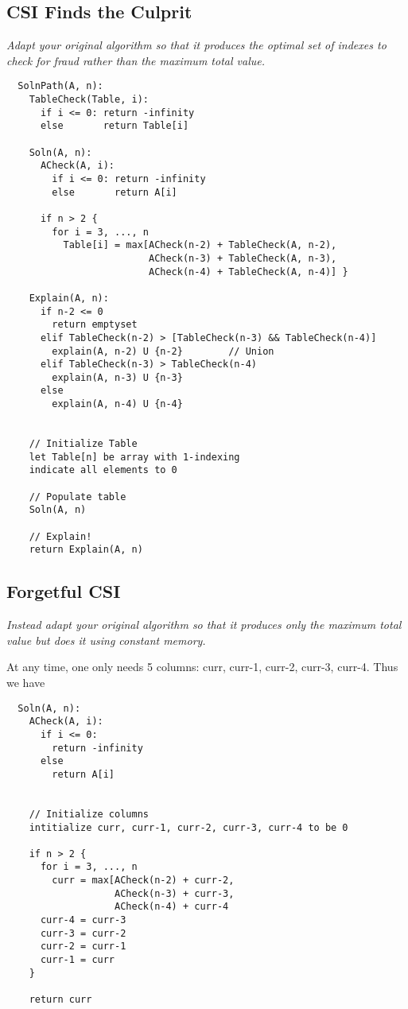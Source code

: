 \documentclass[11pt, oneside]{article}   	%
\theoremstyle{definition}
\theoremstyle{remark}
\begin{document}
\subsection{CSI Finds the Culprit}
\label{sec-2-1}
\textit{Adapt your original algorithm so that it produces the optimal set of indexes to check for fraud rather than the maximum total value.}
\begin{verbatim}
  SolnPath(A, n):
    TableCheck(Table, i):
      if i <= 0: return -infinity
      else       return Table[i]
            
    Soln(A, n):  
      ACheck(A, i):
        if i <= 0: return -infinity
        else       return A[i]

      if n > 2 {
        for i = 3, ..., n
          Table[i] = max[ACheck(n-2) + TableCheck(A, n-2),
                         ACheck(n-3) + TableCheck(A, n-3),
                         ACheck(n-4) + TableCheck(A, n-4)] }
    
    Explain(A, n):
      if n-2 <= 0
        return emptyset
      elif TableCheck(n-2) > [TableCheck(n-3) && TableCheck(n-4)]
        explain(A, n-2) U {n-2}        // Union
      elif TableCheck(n-3) > TableCheck(n-4)
        explain(A, n-3) U {n-3}
      else
        explain(A, n-4) U {n-4}

    
    // Initialize Table
    let Table[n] be array with 1-indexing
    indicate all elements to 0
    
    // Populate table
    Soln(A, n)
    
    // Explain!
    return Explain(A, n)
\end{verbatim}

\subsection{Forgetful CSI}
\label{sec-2-2}

\textit{Instead adapt your original algorithm so that it produces only the
maximum total value but does it using constant memory.}

At any time, one only needs 5 columns: curr, curr-1, curr-2, curr-3, curr-4. Thus we have

\begin{verbatim}
  Soln(A, n):
    ACheck(A, i):
      if i <= 0:
        return -infinity
      else
        return A[i]
    
    
    // Initialize columns
    intitialize curr, curr-1, curr-2, curr-3, curr-4 to be 0
    
    if n > 2 {
      for i = 3, ..., n
        curr = max[ACheck(n-2) + curr-2,
                   ACheck(n-3) + curr-3,
                   ACheck(n-4) + curr-4
      curr-4 = curr-3
      curr-3 = curr-2
      curr-2 = curr-1
      curr-1 = curr    
    }

    return curr
\end{verbatim}
\end{document}
